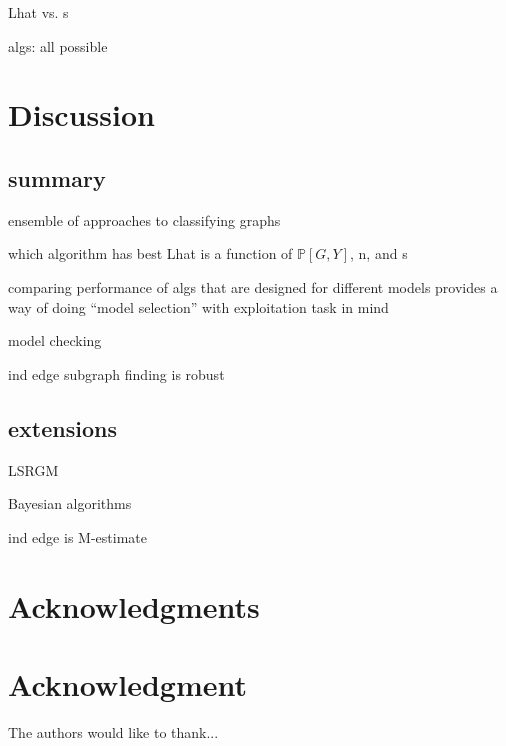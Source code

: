 \documentclass[10pt,journal,cspaper,compsoc]{IEEEtran}
\newcommand{\PP}{\mathbb{P}}
\begin{document}
Lhat vs. s

algs: all possible




\section{Discussion} %
\label{sec:discussion}


\subsection{summary} %
\label{sub:summary}


ensemble of approaches to classifying graphs

which algorithm has best Lhat is a function of $\PP[G,Y]$, n, and s

comparing performance of algs that are designed for different models provides a way of doing ``model selection'' with exploitation task in mind

model checking

ind edge subgraph finding is robust 

\subsection{extensions} %
\label{sub:extensions}

LSRGM

Bayesian algorithms

ind edge is M-estimate




\clearpage
\appendices


\ifCLASSOPTIONcompsoc
  \section*{Acknowledgments}
\else
  \section*{Acknowledgment}
\fi


The authors would like to thank...
\end{document}
